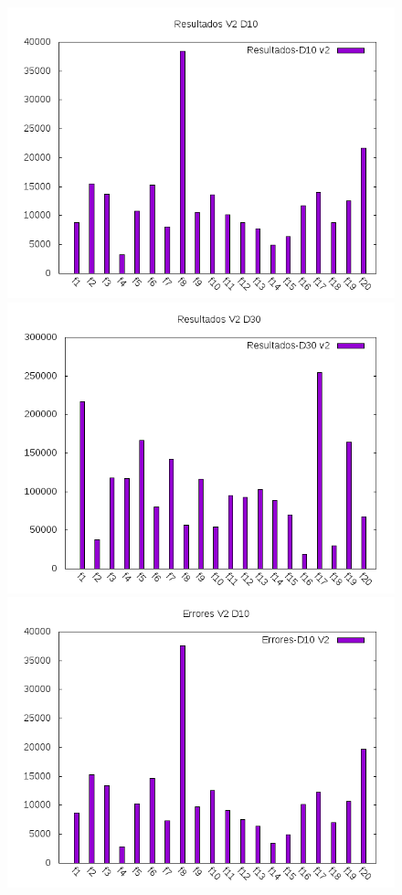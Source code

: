 \documentclass[12pt,a4paper]{article}
\begin{document}
	\begin{figure}[!h]
		\includegraphics[scale=0.5]{../Algoritmo/resultados/Imagenes/Resultados/resultados_v2_d10.png}
		\includegraphics[scale=0.5]{../Algoritmo/resultados/Imagenes/Resultados/resultados_v2_d30.png}
		\includegraphics[scale=0.5]{../Algoritmo/resultados/Imagenes/Errores/errores_v2_d10.png}

\end{figure}
\end{document}
